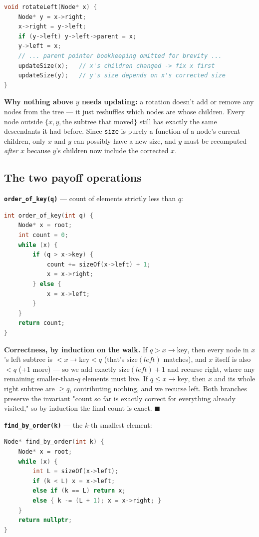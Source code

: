 \documentclass[11pt,a4paper]{article}
\begin{document}
\begin{lstlisting}[language=C++]
void rotateLeft(Node* x) {
    Node* y = x->right;
    x->right = y->left;
    if (y->left) y->left->parent = x;
    y->left = x;
    // ... parent pointer bookkeeping omitted for brevity ...
    updateSize(x);   // x's children changed -> fix x first
    updateSize(y);   // y's size depends on x's corrected size
}
\end{lstlisting}

\textbf{Why nothing above $y$ needs updating:} a rotation doesn't add or remove any nodes from the tree --- it just reshuffles which nodes are whose children. Every node outside $\{x, y, \text{the subtree that moved}\}$ still has exactly the same descendants it had before. Since \texttt{size} is purely a function of a node's current children, only $x$ and $y$ can possibly have a new size, and $y$ must be recomputed \emph{after} $x$ because $y$'s children now include the corrected $x$.

\subsection{The two payoff operations}

\textbf{\texttt{order\_of\_key(q)}} --- count of elements strictly less than $q$:

\begin{lstlisting}[language=C++]
int order_of_key(int q) {
    Node* x = root;
    int count = 0;
    while (x) {
        if (q > x->key) {
            count += sizeOf(x->left) + 1;
            x = x->right;
        } else {
            x = x->left;
        }
    }
    return count;
}
\end{lstlisting}

\textbf{Correctness, by induction on the walk.} If $q > x{\to}\text{key}$, then every node in $x$'s left subtree is $< x{\to}\text{key} < q$ (that's $\text{size}(left)$ matches), and $x$ itself is also $< q$ (+1 more) --- so we add exactly $\text{size}(left)+1$ and recurse right, where any remaining smaller-than-$q$ elements must live. If $q \le x{\to}\text{key}$, then $x$ and its whole right subtree are $\ge q$, contributing nothing, and we recurse left. Both branches preserve the invariant "count so far is exactly correct for everything already visited," so by induction the final count is exact. $\blacksquare$

\textbf{\texttt{find\_by\_order(k)}} --- the $k$-th smallest element:

\begin{lstlisting}[language=C++]
Node* find_by_order(int k) {
    Node* x = root;
    while (x) {
        int L = sizeOf(x->left);
        if (k < L) x = x->left;
        else if (k == L) return x;
        else { k -= (L + 1); x = x->right; }
    }
    return nullptr;
}
\end{lstlisting}
\end{document}
